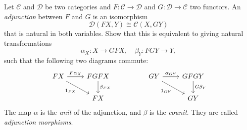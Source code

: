\documentclass[11pt,letterpaper]{article}
\def\CC{\mathcal{C}}
\def\DD{\mathcal{D}}
\begin{document}
\begin{problem}
    Let $\CC$ and $\DD$ be two categories and $F : \CC \to \DD$ and $G : \DD \to \CC$ two functors. An \emph{adjunction} between $F$ and $G$ is an isomorphism
    \[
        \DD(FX, Y) \cong \CC(X, GY)
    \]
    that is natural in both variables. Show that this is equivalent to giving natural transformations
    \[
        \alpha_X : X \to GFX, \quad \beta_Y : FGY \to Y
    ,\]
    such that the following two diagrams commute:
    \[\begin{tikzcd}
        FX & FGFX && GY & GFGY \\
        & FX &&& GY
        \arrow["{1_{FX}}"', from=1-1, to=2-2]
        \arrow["{F\alpha_X}", from=1-1, to=1-2]
        \arrow["{\beta_{FX}}", from=1-2, to=2-2]
        \arrow["{1_{GY}}"', from=1-4, to=2-5]
        \arrow["{\alpha_{GY}}", from=1-4, to=1-5]
        \arrow["{G\beta_Y}", from=1-5, to=2-5]
    \end{tikzcd}\]
    The map $\alpha$ is the \emph{unit} of the adjunction, and $\beta$ is the \emph{counit}. They are called \emph{adjunction morphisms}.
\end{problem}
\end{document}
